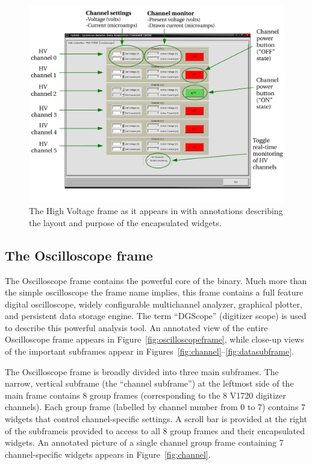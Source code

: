 \begin{figure}
  \centering
  \includegraphics[width=6in]{images/HighVoltageFrame}
  \caption{The High Voltage frame as it appears in
    \ADAQ with annotations describing the layout and
    purpose of the encapsulated widgets.}
  \label{fig:highvoltageframe}
\end{figure}

\subsection{The Oscilloscope frame}
The Oscilloscope frame contains the powerful core of the
\ADAQ binary. Much more than the simple oscilloscope
the frame name implies, this frame contains a full feature digital
oscilloscope, widely configurable multichannel analyzer, graphical
plotter, and persistent data storage engine. The term ``DGScope''
(digitizer scope) is used to describe this powerful analysis tool. An
annotated view of the entire Oscilloscope frame appears in
Figure~\ref{fig:oscilloscopeframe}, while close-up views of the
important subframes appear in
Figures~\ref{fig:channel}--\ref{fig:datasubframe}.

The Oscilloscope frame is broadly divided into three main
subframes. The narrow, vertical subframe (the ``channel subframe'') at
the leftmost side of the main frame contains 8 group frames
(corresponding to the 8 V1720 digitizer channels).  Each group frame
(labelled by channel number from 0 to 7) contains 7 widgets that
control channel-specific settings. A scroll bar is provided at the
right of the subframeis provided to access to all 8 group frames and
their encapsulated widgets. An annotated picture of a single channel
group frame containing 7 channel-specific widgets appears in
Figure~\ref{fig:channel}.

